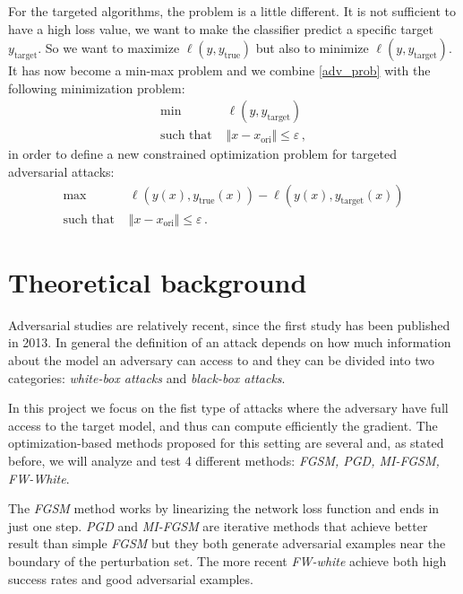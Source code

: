 \documentclass[10pt,twocolumn,letterpaper, english]{article}
\theoremstyle{definition}
\theoremstyle{plain}
\theoremstyle{plain}
\theoremstyle{plain}
\theoremstyle{plain}
\theoremstyle{remark}
\theoremstyle{remark}
\theoremstyle{definition}
\theoremstyle{definition}
\theoremstyle{definition}
\theoremstyle{definition}
\renewcommand{\epsilon}{\varepsilon}
\begin{document}
For the targeted algorithms, the problem is a little different. 
It is not sufficient to have a high loss value, we want to make the classifier predict a specific target $y_{\text{target}}$. 
So we want to maximize $\ell(y, y_{\text{true}})$ but also to minimize $\ell(y, y_{\text{target}})$. 
It has now become a min-max problem and we combine \ref{adv_prob} with the following minimization problem:
\begin{align*}
    \min \,\, &\ell(y, y_{\text{target}}) \\ 
    \text{such that } & \Vert x - x_{\text{ori}} \Vert \le \epsilon \,,
\end{align*}
in order to define a new constrained optimization problem for targeted adversarial attacks: 
\begin{align}
    \max \,\, & \ell(y(x), y_{\text{true}}(x)) - \ell(y(x), y_{\text{target}}(x)) \label{targ_prob} \\
    \text{such that } & \Vert x - x_{\text{ori}} \Vert \le \epsilon \nonumber \,.
\end{align}




\section{Theoretical background}
Adversarial studies are relatively recent, since the first study has been published in 2013. In general the definition of an attack depends on how much information about the model an adversary can access to and they can be divided into two categories: \textit{white-box attacks} and \textit{black-box attacks}.

In this project we focus on the fist type of attacks where the adversary have full access to the target model, and thus can compute efficiently the gradient. The optimization-based methods proposed for this setting are several and, as stated before, we will analyze and test 4 different methods: \textit{FGSM, PGD, MI-FGSM, FW-White}.

The \textit{FGSM} method works by linearizing the network loss function and ends in just one step. \textit{PGD} and \textit{MI-FGSM} are iterative methods that achieve better result than simple \textit{FGSM} but they both generate adversarial examples near the boundary of the perturbation set. The more recent \textit{FW-white} achieve both high success rates and good adversarial examples.
\end{document}
